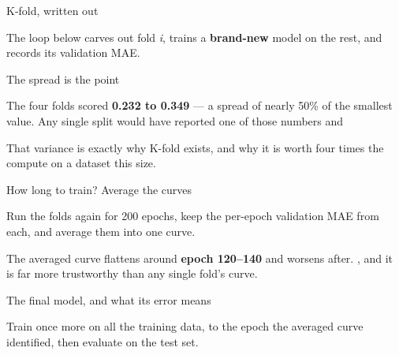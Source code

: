 \documentclass[aspectratio=169,11pt,t]{beamer}
\begin{document}
\begin{frame}[shrink=25]{K-fold, written out}
{\fontsize{9.4}{12.6}\selectfont\color{fg2}The loop below carves out fold \textit{i}, trains a \textbf{brand-new} model on the rest, and records its validation MAE.\par}\vskip 4pt
\end{frame}

\begin{frame}[shrink=25]{The spread is the point}
\begin{iband}[amber]
The four folds scored \textbf{0.232 to 0.349} --- a spread of nearly 50\% of the smallest value. Any single split would have reported one of those numbers and 
\end{iband}
{\fontsize{9.4}{12.6}\selectfont\color{fg2}That variance is exactly why K-fold exists, and why it is worth four times the compute on a dataset this size.\par}\vskip 4pt
\end{frame}

\begin{frame}[shrink=25]{How long to train? Average the curves}
{\fontsize{9.4}{12.6}\selectfont\color{fg2}Run the folds again for 200 epochs, keep the per-epoch validation MAE from each, and average them into one curve.\par}\vskip 4pt
\begin{iband}[signal]
The averaged curve flattens around \textbf{epoch 120--140} and worsens after. , and it is far more trustworthy than any single fold's curve.
\end{iband}
\end{frame}

\begin{frame}[shrink=25]{The final model, and what its error means}
{\fontsize{9.4}{12.6}\selectfont\color{fg2}Train once more on all the training data, to the epoch the averaged curve identified, then evaluate on the test set.\par}\vskip 4pt
\begin{minipage}[t]{0.494\textwidth}
\end{minipage}%
\hfill
\begin{minipage}[t]{0.494\textwidth}
\end{minipage}%
\end{frame}
\end{document}
